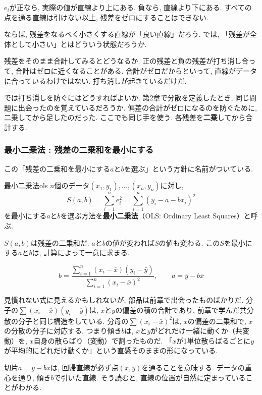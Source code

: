 $e_i$が正なら, 実際の値が直線より上にある.
負なら, 直線より下にある.
すべての点を通る直線は引けない以上, 残差をゼロにすることはできない.

ならば, 残差をなるべく小さくする直線が「良い直線」だろう.
では, 「残差が全体として小さい」とはどういう状態だろうか.

残差をそのまま合計してみるとどうなるか.
正の残差と負の残差が打ち消し合って, 合計はゼロに近くなることがある.
合計がゼロだからといって, 直線がデータに合っているわけではない.
打ち消しが起きているだけだ.

では打ち消しを防ぐにはどうすればよいか.
第2章で分散を定義したとき, 同じ問題に出会ったのを覚えているだろうか.
偏差の合計がゼロになるのを防ぐために, 二乗してから足したのだった.
ここでも同じ手を使う.
各残差を\textbf{二乗}してから合計する.

\subsubsection*{最小二乗法 : 残差の二乗和を最小にする}

この「残差の二乗和を最小にする$a$と$b$を選ぶ」という方針に名前がついている.

\begin{defi}{最小二乗法}{ols}
$n$個のデータ$(x_1, y_1), \ldots, (x_n, y_n)$に対し,
\[
  S(a, b) = \sum_{i=1}^{n} e_i^2 = \sum_{i=1}^{n} (y_i - a - bx_i)^2
\]
を最小にする$a$と$b$を選ぶ方法を\textbf{最小二乗法}（OLS: Ordinary Least Squares）と呼ぶ.
\end{defi}

$S(a, b)$は残差の二乗和だ.
$a$と$b$の値が変われば$S$の値も変わる.
この$S$を最小にする$a$と$b$は, 計算によって一意に求まる.

\[
  b = \frac{\displaystyle\sum_{i=1}^{n}(x_i - \bar{x})(y_i - \bar{y})}{\displaystyle\sum_{i=1}^{n}(x_i - \bar{x})^2}, \qquad a = \bar{y} - b\bar{x}
\]

見慣れない式に見えるかもしれないが, 部品は前章で出会ったものばかりだ.
分子の$\sum(x_i - \bar{x})(y_i - \bar{y})$は, $x$と$y$の偏差の積の合計であり, 前章で学んだ共分散の分子と同じ構造をしている.
分母の$\sum(x_i - \bar{x})^2$は, $x$の偏差の二乗和で, $x$の分散の分子に対応する.
つまり傾き$b$は, $x$と$y$がどれだけ一緒に動くか（共変動）を, $x$自身の散らばり（変動）で割ったものだ.
「$x$が1単位散らばるごとに$y$が平均的にどれだけ動くか」という直感そのままの形になっている.

切片$a = \bar{y} - b\bar{x}$は, 回帰直線が必ず点$(\bar{x}, \bar{y})$を通ることを意味する.
データの重心を通り, 傾き$b$で引いた直線.
そう読むと, 直線の位置が自然に定まっていることがわかる.

